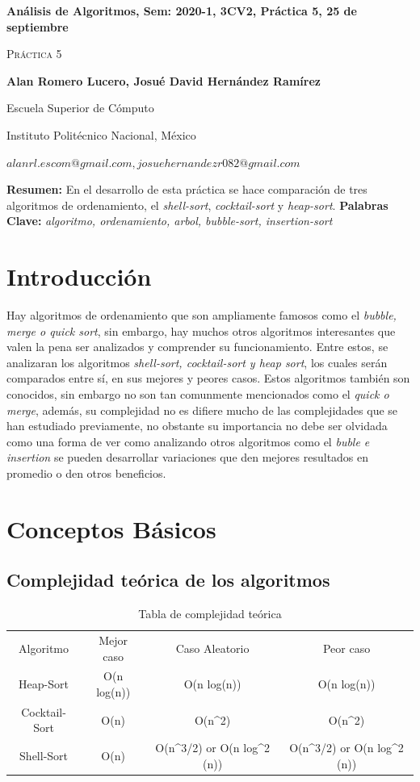 \documentclass[12pt,twoside]{article}
\date{}
\begin{document}
\centerline{\bf An\'alisis de Algoritmos, Sem: 2020-1, 3CV2, Pr\'actica 5, 25 de septiembre}
\centerline{}
\centerline{}
\begin{center}
\Large{\textsc{Pr\'actica 5}}
\end{center}
\centerline{\bf{Alan Romero Lucero, Josu\'e David Hern\'andez Ram\'irez}}
\centerline{}
\centerline{Escuela Superior de C\'omputo}
\centerline{Instituto Polit\'ecnico Nacional, M\'exico}
\centerline{$alanrl.escom@gmail.com, josuehernandezr082@gmail.com$}
\newtheorem{Theorem}{\quad Theorem}[section]
\newtheorem{Definition}[Theorem]{\quad Definition}
\newtheorem{Corollary}[Theorem]{\quad Corollary}
\newtheorem{Lemma}[Theorem]{\quad Lemma}
\newtheorem{Example}[Theorem]{\quad Example}
\bigskip
\textbf{Resumen:} En el desarrollo de esta pr\'actica se hace comparaci\'on de tres algoritmos de ordenamiento, el \textit{shell-sort}, \textit{cocktail-sort} y \textit{heap-sort}.
{\bf Palabras Clave:} {\textit{algoritmo, ordenamiento, arbol, bubble-sort, insertion-sort}}
\section{Introducci\'on}
Hay algoritmos de ordenamiento que son ampliamente famosos como el \textit{bubble, merge o quick sort}, sin embargo, hay muchos otros algoritmos interesantes que valen la pena ser analizados y comprender su funcionamiento. Entre estos, se analizaran los algoritmos \textit{shell-sort, cocktail-sort y heap sort}, los cuales ser\'an comparados entre s\'i, en sus mejores y peores casos. Estos algoritmos tambi\'en son conocidos, sin embargo no son tan comunmente mencionados como el \textit{quick o merge}, adem\'as, su complejidad no es difiere mucho de las complejidades que se han estudiado previamente, no obstante su importancia no debe ser olvidada como una forma de ver como analizando otros algoritmos como el \textit{buble e insertion} se pueden desarrollar variaciones que den mejores resultados en promedio o den otros beneficios.

\section{Conceptos B\'asicos}
\subsection{Complejidad te\'orica de los algoritmos}
\begin{table}[htbp]
\centering
\begin{tabular}{|c|c|c|c|}
\hline
Algoritmo & Mejor caso & Caso Aleatorio & Peor caso \\
Heap-Sort & O(n log(n)) & O(n log(n)) & O(n log(n)) \\
Cocktail-Sort & O(n) & O(n\textasciicircum{}2) & O(n\textasciicircum{}2) \\
Shell-Sort & O(n) & O(n\textasciicircum{}3/2) or O(n log\textasciicircum{}2 (n)) & O(n\textasciicircum{}3/2) or O(n log\textasciicircum{}2 (n))
\end{tabular}
\caption{Tabla de complejidad te\'orica}
\end{table}
\end{document}
